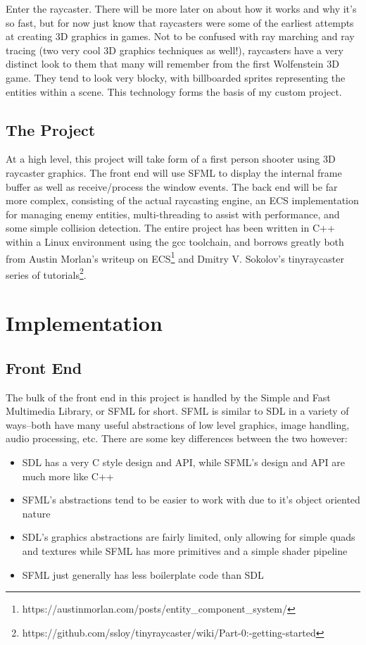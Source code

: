 \documentclass{article}
\begin{document}
Enter the raycaster. There will be more later on about how it works and why it's
so fast, but for now just know that raycasters were some of the earliest
attempts at creating 3D graphics in games. Not to be confused with ray marching
and ray tracing (two very cool 3D graphics techniques as well!), raycasters have
a very distinct look to them that many will remember from the first Wolfenstein
3D game. They tend to look very blocky, with billboarded sprites representing
the entities within a scene. This technology forms the basis of my custom
project.

\subsection{The Project}
At a high level, this project will take form of a first person shooter using
3D raycaster graphics. The front end will use SFML to display the internal frame
buffer as well as receive/process the window events. The back end will be far
more complex, consisting of the actual raycasting engine, an ECS implementation
for managing enemy entities, multi-threading to assist with performance, and
some simple collision detection. The entire project has been written in C++
within a Linux environment using the gcc toolchain, and borrows greatly both
from Austin Morlan's writeup on ECS\footnote{https://austinmorlan.com/posts/entity\_component\_system/}
and Dmitry V. Sokolov's tinyraycaster series of tutorials\footnote{https://github.com/ssloy/tinyraycaster/wiki/Part-0:-getting-started}.

\section{Implementation}

\subsection{Front End}
The bulk of the front end in this project is handled by the Simple and Fast
Multimedia Library, or SFML for short. SFML is similar to SDL in a variety of
ways--both have many useful abstractions of low level graphics, image handling,
audio processing, etc. There are some key differences between the two however:

\begin{itemize}
    \item SDL has a very C style design and API, while SFML's design and API are
          much more like C++
    \item SFML's abstractions tend to be easier to work with due to it's object
          oriented nature
    \item SDL's graphics abstractions are fairly limited, only allowing for
          simple quads and textures while SFML has more primitives and a simple
          shader pipeline
    \item SFML just generally has less boilerplate code than SDL
\end{itemize}
\end{document}
